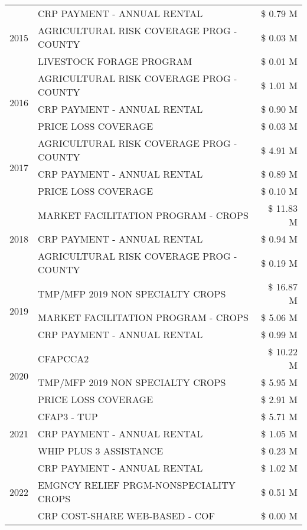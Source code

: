 \begin{tabular}{llr}
\multirow[t]{3}{*}{2015} & CRP PAYMENT - ANNUAL RENTAL & \$ 0.79 M \\
 & AGRICULTURAL RISK COVERAGE PROG - COUNTY & \$ 0.03 M \\
 & LIVESTOCK FORAGE PROGRAM & \$ 0.01 M \\
\cline{1-3}
\multirow[t]{3}{*}{2016} & AGRICULTURAL RISK COVERAGE PROG - COUNTY & \$ 1.01 M \\
 & CRP PAYMENT - ANNUAL RENTAL & \$ 0.90 M \\
 & PRICE LOSS COVERAGE & \$ 0.03 M \\
\cline{1-3}
\multirow[t]{3}{*}{2017} & AGRICULTURAL RISK COVERAGE PROG - COUNTY & \$ 4.91 M \\
 & CRP PAYMENT - ANNUAL RENTAL & \$ 0.89 M \\
 & PRICE LOSS COVERAGE & \$ 0.10 M \\
\cline{1-3}
\multirow[t]{3}{*}{2018} & MARKET FACILITATION PROGRAM - CROPS & \$ 11.83 M \\
 & CRP PAYMENT - ANNUAL RENTAL & \$ 0.94 M \\
 & AGRICULTURAL RISK COVERAGE PROG - COUNTY & \$ 0.19 M \\
\cline{1-3}
\multirow[t]{3}{*}{2019} & TMP/MFP 2019 NON SPECIALTY CROPS & \$ 16.87 M \\
 & MARKET FACILITATION PROGRAM - CROPS & \$ 5.06 M \\
 & CRP PAYMENT - ANNUAL RENTAL & \$ 0.99 M \\
\cline{1-3}
\multirow[t]{3}{*}{2020} & CFAPCCA2 & \$ 10.22 M \\
 & TMP/MFP 2019 NON SPECIALTY CROPS & \$ 5.95 M \\
 & PRICE LOSS COVERAGE & \$ 2.91 M \\
\cline{1-3}
\multirow[t]{3}{*}{2021} & CFAP3 - TUP & \$ 5.71 M \\
 & CRP PAYMENT - ANNUAL RENTAL & \$ 1.05 M \\
 & WHIP PLUS 3 ASSISTANCE & \$ 0.23 M \\
\cline{1-3}
\multirow[t]{3}{*}{2022} & CRP PAYMENT - ANNUAL RENTAL & \$ 1.02 M \\
 & EMGNCY RELIEF PRGM-NONSPECIALITY CROPS & \$ 0.51 M \\
 & CRP COST-SHARE WEB-BASED - COF & \$ 0.00 M \\
\cline{1-3}
\bottomrule
\end{tabular}
